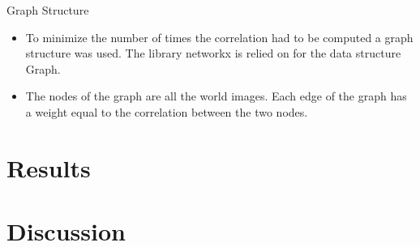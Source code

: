 \documentclass{article}
\begin{document}
Graph Structure
\begin{itemize}
\item To minimize the number of times the correlation had to be computed a graph structure was used. The library networkx is relied on for the data structure Graph.
\item The nodes of the graph are all the world images. Each edge of the graph has a weight equal to the correlation between the two nodes.
\end{itemize}

\section{Results}
\section{Discussion}
\end{document}
